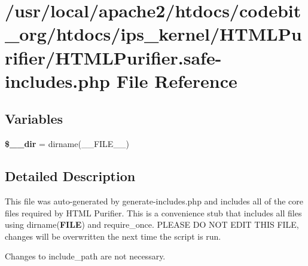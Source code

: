 \hypertarget{_h_t_m_l_purifier_8safe-includes_8php}{\section{/usr/local/apache2/htdocs/codebit\-\_\-org/htdocs/ips\-\_\-kernel/\-H\-T\-M\-L\-Purifier/\-H\-T\-M\-L\-Purifier.safe-\/includes.php File Reference}
\label{_h_t_m_l_purifier_8safe-includes_8php}
}
\subsection*{Variables}
\begin{DoxyCompactItemize}
\item 
\hypertarget{_h_t_m_l_purifier_8safe-includes_8php_a677ca43b70d67e460cab488e976cec07}{{\bfseries \$\-\_\-\-\_\-dir} = dirname(\-\_\-\-\_\-\-F\-I\-L\-E\-\_\-\-\_\-)}\label{_h_t_m_l_purifier_8safe-includes_8php_a677ca43b70d67e460cab488e976cec07}

\end{DoxyCompactItemize}


\subsection{Detailed Description}
This file was auto-\/generated by generate-\/includes.\-php and includes all of the core files required by H\-T\-M\-L Purifier. This is a convenience stub that includes all files using dirname({\bfseries F\-I\-L\-E}) and require\-\_\-once. P\-L\-E\-A\-S\-E D\-O N\-O\-T E\-D\-I\-T T\-H\-I\-S F\-I\-L\-E, changes will be overwritten the next time the script is run.

Changes to include\-\_\-path are not necessary. 